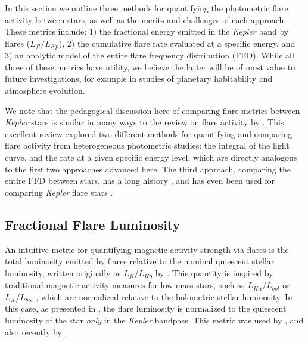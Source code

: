 \documentclass[preprint2]{aastex62}
\newcommand{\Kepler}{\textsl{Kepler}\xspace}
\begin{document}
In this section we outline three methods for quantifying the photometric flare activity between stars, as well as the merits and challenges of each approach. These metrics include: 1) the fractional energy emitted in the \Kepler band by flares ($L_{fl}/L_{Kp}$), 2) the cumulative flare rate evaluated at a specific energy, and 3) an analytic model of the entire flare frequency distribution (FFD). While all three of these metrics have utility, we believe the latter will be of most value to future investigations, for example in studies of planetary habitability and atmosphere evolution. 

We note that the pedagogical discussion here of comparing flare metrics between \Kepler stars is similar in many ways to the review on flare activity by \citet{kunkel1975}. This excellent review explored two different methods for quantifying and comparing flare activity from heterogeneous photometric studies: the integral of the light curve, and the rate at a given specific energy level, which are directly analogous to the first two approaches advanced here. The third approach, comparing the entire FFD between stars, has a long history \citep[e.g. see Fig. 17 of][]{lme1976}, and has even been used for comparing \Kepler flare stars \citep[e.g.][]{ramsay2013,hawley2014}.




\subsection{Fractional Flare Luminosity}
\label{sec:fracL}

An intuitive metric for quantifying magnetic activity strength via flares is the total luminosity emitted by flares relative to the nominal quiescent stellar luminosity, written originally as $L_{fl}/L_{Kp}$ by \citet{lurie2015}. This quantity is inspired by traditional magnetic activity measures for low-mass stars, such as $L_{H\alpha}/L_{bol}$  \citep{walkowicz2004} or $L_X/L_{bol}$ \citep{pallavicini1981}, which are normalized relative to the bolometric stellar luminosity. In this case, as presented in \citet{lurie2015}, the flare luminosity is normalized to the quiescent luminosity of the star {\it only} in the \Kepler bandpass. This metric was used by \citet{davenport2016}, and also recently by \citet{yang2017}. %

\end{document}
